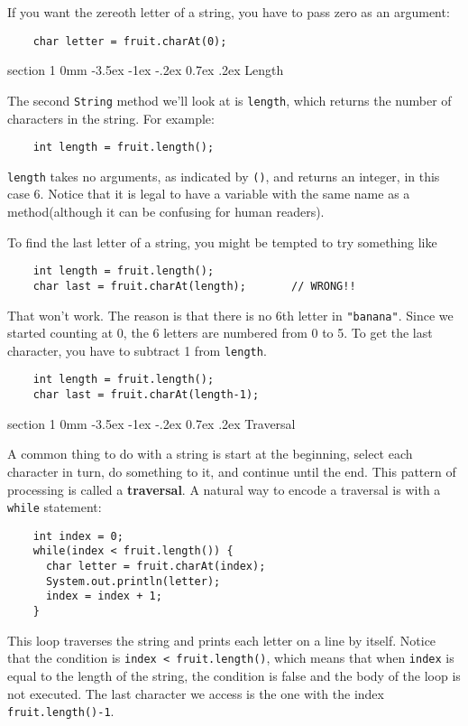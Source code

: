 \documentclass{book}
\makeatletter
\renewcommand{\section}{\@startsection 
    {section} {1} {0mm}%
    {-3.5ex \@plus -1ex \@minus -.2ex}%
    {0.7ex \@plus.2ex}%
    {\normalfont\Large\bfseries}}
\makeatother
\begin{document}
If you want the zereoth letter of a string, you have to pass
zero as an argument:

\begin{verbatim}
    char letter = fruit.charAt(0);
\end{verbatim}

\section{Length}

The second {\tt String} method we'll look at is {\tt length}, which
returns the number of characters in the string.  For example:

\begin{verbatim}
    int length = fruit.length();
\end{verbatim}
%
{\tt length} takes no arguments, as indicated by {\tt()},
and returns an integer, in this case 6.  Notice that it is
legal to have a variable with the same name as a method(although
it can be confusing for human readers).

To find the last letter of a string, you might be tempted to
try something like

\begin{verbatim}
    int length = fruit.length();
    char last = fruit.charAt(length);       // WRONG!!
\end{verbatim}
%
That won't work.  The reason is that there is no 6th letter
in {\tt "banana"}.  Since we started counting at 0, the 6
letters are numbered from 0 to 5.  To get the last character,
you have to subtract 1 from {\tt length}.

\begin{verbatim}
    int length = fruit.length();
    char last = fruit.charAt(length-1);
\end{verbatim}


\section{Traversal}
\label{traverse}

A common thing to do with a string is
start at the beginning, select each character in turn, do
something to it, and continue until the end.  This pattern
of processing is called a {\bf traversal}.  A natural
way to encode a traversal is with a {\tt while} statement:

\begin{verbatim}
    int index = 0;
    while(index < fruit.length()) {
      char letter = fruit.charAt(index);
      System.out.println(letter);
      index = index + 1;
    }
\end{verbatim}
%
This loop traverses the string and prints each letter on
a line by itself.  Notice that the condition is
{\tt index < fruit.length()}, which means that when
{\tt index} is equal to the length of the string, the
condition is false and the body of the loop is not executed.
The last character we access is the one with the
index {\tt fruit.length()-1}.
\end{document}
